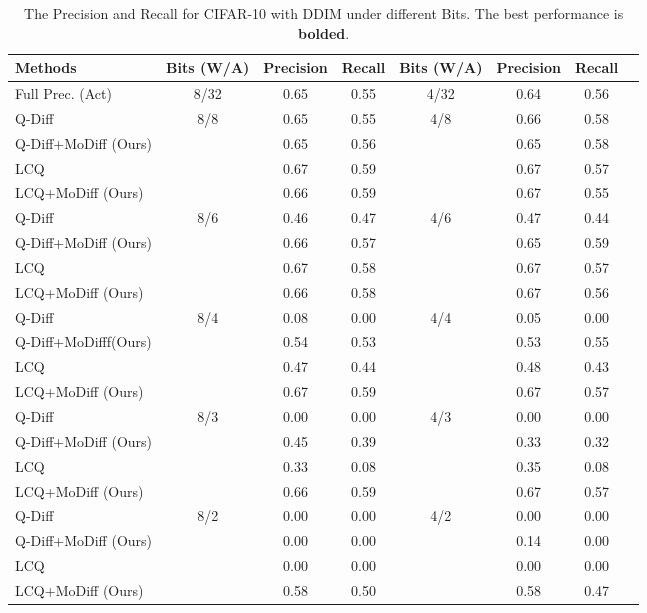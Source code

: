 \begin{table}[!ht]
\small
\centering
\caption{The Precision and Recall for CIFAR-10 with DDIM under different Bits. The best performance is \textbf{bolded}.}
\begin{tabular}{l|c|cc||c|ccc}
\toprule
{Methods} & {Bits (W/A)} & Precision & Recall & {Bits (W/A)} & Precision  & Recall & \\
\midrule
Full Prec. (Act) & 8/32 & 0.65 & 0.55 & 4/32 & 0.64 & 0.56\\
\midrule
Q-Diff & \multirow{4}{*}{8/8} & 0.65 & 0.55 & \multirow{4}{*}{4/8} & 0.66 & 0.58 \\
Q-Diff+MoDiff (Ours) & & 0.65 & 0.56 & & 0.65 & 0.58 & \\
LCQ & & 0.67 & 0.59 & & 0.67 & 0.57 & \\
LCQ+MoDiff (Ours) & & 0.66 & 0.59 & & 0.67 & 0.55 & \\
\midrule
Q-Diff & \multirow{4}{*}{8/6} & 0.46 & 0.47 & \multirow{4}{*}{4/6} & 0.47 & 0.44 \\
Q-Diff+MoDiff (Ours) & & 0.66 & 0.57 & & 0.65 & 0.59 & \\
LCQ & & 0.67 & 0.58 & & 0.67 & 0.57 & \\
LCQ+MoDiff (Ours) & & 0.66 & 0.58 & & 0.67 & 0.56 & \\
\midrule
Q-Diff & \multirow{4}{*}{8/4} & 0.08 & 0.00 & \multirow{4}{*}{4/4} & 0.05 & 0.00 \\
Q-Diff+MoDifff(Ours) & & 0.54 & 0.53 & & 0.53 & 0.55 & \\
LCQ & & 0.47 & 0.44 & & 0.48 & 0.43 & \\
LCQ+MoDiff (Ours) & & 0.67 & 0.59 & & 0.67 & 0.57 & \\
\midrule
Q-Diff & \multirow{4}{*}{8/3} & 0.00 & 0.00 & \multirow{4}{*}{4/3} & 0.00 & 0.00 \\
Q-Diff+MoDiff (Ours) & & 0.45 & 0.39 & & 0.33 & 0.32 & \\
LCQ & & 0.33 & 0.08 & & 0.35 & 0.08 & \\
LCQ+MoDiff (Ours)& & 0.66 & 0.59 & & 0.67 & 0.57 & \\
\midrule
Q-Diff & \multirow{4}{*}{8/2} & 0.00 & 0.00 & \multirow{4}{*}{4/2} & 0.00 & 0.00 \\
Q-Diff+MoDiff (Ours) & & 0.00 & 0.00 & & 0.14 & 0.00 & \\
LCQ & & 0.00 & 0.00 & & 0.00 & 0.00 & \\
LCQ+MoDiff (Ours) & & 0.58 & 0.50 & & 0.58 & 0.47 & \\
\bottomrule
\end{tabular}
\label{tab:cifar10_pr}
\end{table}

